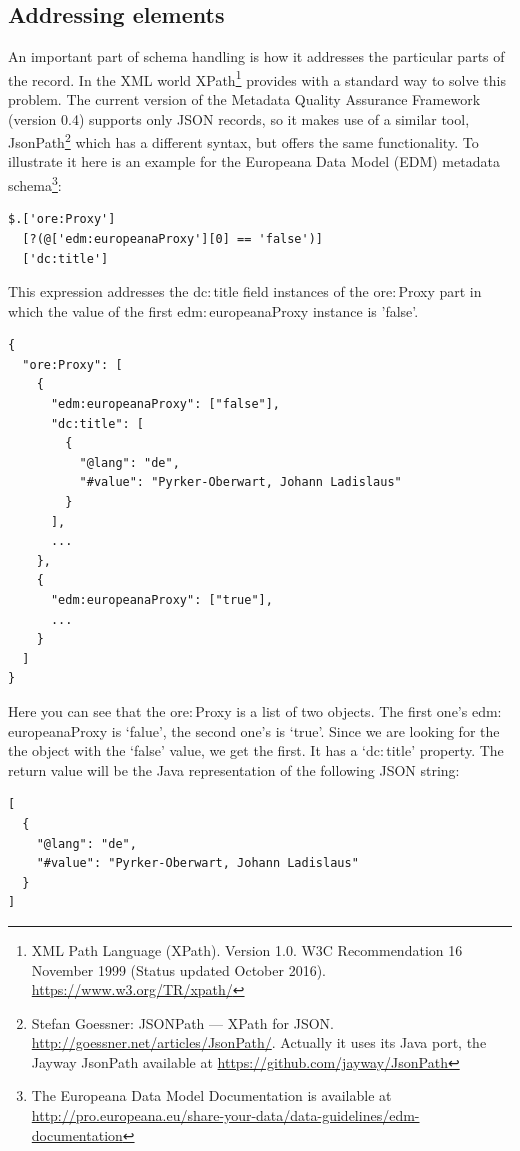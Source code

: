 \subsection{Addressing elements}

An important part of schema handling is how it addresses the particular parts of the record. In the XML world XPath\footnote{XML Path Language (XPath). Version 1.0. W3C Recommendation 16 November 1999 (Status updated October 2016). \url{https://www.w3.org/TR/xpath/}} provides with a standard way to solve this problem. The current version of the Metadata Quality Assurance Framework (version 0.4) supports only JSON records, so it makes use of a similar tool, JsonPath\footnote{Stefan Goessner: JSONPath --- XPath for JSON. \url{http://goessner.net/articles/JsonPath/}. Actually it uses its Java port, the Jayway JsonPath available at \url{https://github.com/jayway/JsonPath}} which has a different syntax, but offers the same functionality. To illustrate it here is an example for the Europeana Data Model (EDM) metadata schema\footnote{The Europeana Data Model Documentation is available at \url{http://pro.europeana.eu/share-your-data/data-guidelines/edm-documentation}}:

\begin{lstlisting}[caption=A JSON path example]
$.['ore:Proxy']
  [?(@['edm:europeanaProxy'][0] == 'false')]
  ['dc:title']
\end{lstlisting}

This expression addresses the dc$:$title field instances of the ore$:$Proxy part in which the value of the first edm$:$europeanaProxy instance is 'false'.

\begin{lstlisting}[caption=An excerpt of an EDM metadata record]
{
  "ore:Proxy": [
    {
      "edm:europeanaProxy": ["false"],
      "dc:title": [
        {
          "@lang": "de",
          "#value": "Pyrker-Oberwart, Johann Ladislaus"
        }
      ],
      ...
    },
    {
      "edm:europeanaProxy": ["true"],
      ...
    }
  ]
}
\end{lstlisting}

Here you can see that the ore$:$Proxy is a list of two objects. The first one's edm$:$europeanaProxy is `falue', the second one's is `true'. Since we are looking for the the object with the `false' value, we get the first. It has a `dc$:$title' property. The return value will be the Java representation of the following JSON string:

\begin{lstlisting}[caption=The selected part of the record]
[
  {
    "@lang": "de",
    "#value": "Pyrker-Oberwart, Johann Ladislaus"
  }
]
\end{lstlisting}


